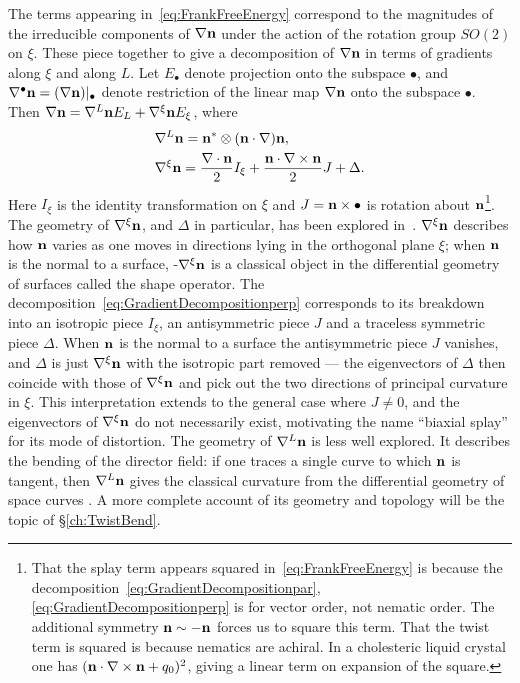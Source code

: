 The terms appearing in~\eqref{eq:FrankFreeEnergy} correspond to the magnitudes of the irreducible components of $\nabla{\bf n}$ under the action of the rotation group $SO(2)$ on $\xi$. These piece together to give a decomposition of $\nabla {\bf n}$ in terms of gradients along $\xi$ and along $L$. Let $E_\bullet$ denote projection onto the subspace $\bullet$, and $\nabla^\bullet \bf n = (\nabla \bf n)|_\bullet$ denote restriction of the linear map $\nabla \bf n$ onto the subspace $\bullet$. Then $\nabla {\bf n}=\nabla^{L}{\bf n}E_L + \nabla^\xi {\bf n}E_\xi$, where 
\begin{align}
    &\nabla^L {\bf n}=  {\bf n}^* \otimes ({\bf n} \cdot \nabla) {\bf n}\label{eq:GradientDecompositionpar}, \\
    &\nabla^\xi {\bf n}= \frac{\nabla \cdot {\bf n}}{2}I_\xi + \frac{{\bf n} \cdot \nabla \times {\bf n}}{2} J + \Delta .
    \label{eq:GradientDecompositionperp}
\end{align}
Here $I_\xi$ is the identity transformation on $\xi$ and $J= \bf n \times \bullet$ is rotation about $\bf n$\footnote{That the splay term appears squared in~\eqref{eq:FrankFreeEnergy} is because the decomposition~\eqref{eq:GradientDecompositionpar},\eqref{eq:GradientDecompositionperp} is for vector order, not nematic order. The additional symmetry $\bf n \sim -n$ forces us to square this term. That the twist term is squared is because nematics are achiral. In a cholesteric liquid crystal \citep{Bellar2014} one has $({\bf n} \cdot \nabla \times {\bf n}+q_0)^2$, giving a linear term on expansion of the square.}. The geometry of $\nabla^\xi \bf n$, and $\Delta$ in particular, has been explored in~\citep{Machon2016b}. $\nabla^\xi \bf n$ describes how $\bf n$ varies as one moves in directions lying in the orthogonal plane $\xi$; when $\bf n$ is the normal to a surface, -$\nabla^\xi \bf n$ is a classical object in the differential geometry of surfaces called the shape operator. The decomposition~\eqref{eq:GradientDecompositionperp} corresponds to its breakdown into an isotropic piece $I_\xi$, an antisymmetric piece $J$ and a traceless symmetric piece $\Delta$. When $\bf n$ is the normal to a surface the antisymmetric piece $J$ vanishes, and $\Delta$ is just $\nabla^\xi \bf n$ with the isotropic part removed --- the eigenvectors of $\Delta$ then coincide with those of $\nabla^\xi \bf n$ and pick out the two directions of principal curvature in $\xi$. This interpretation extends to the general case where $J \neq 0$, and the eigenvectors of $\nabla^\xi \bf n$ do not necessarily exist, motivating the name ``biaxial splay'' for its mode of distortion. The geometry of $\nabla^L \bf n$ is less well explored. It describes the bending of the director field: if one traces a single curve to which $\bf n$ is tangent, then $\nabla^L \bf n $ gives the classical curvature from the differential geometry of space curves \citep{DoCarmoBook}. A more complete account of its geometry and topology will be the topic of \S\ref{ch:TwistBend}.
 
